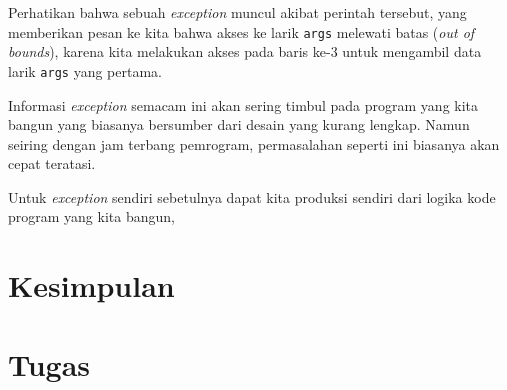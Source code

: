 Perhatikan bahwa sebuah \textit{exception} muncul akibat perintah tersebut, yang memberikan pesan ke kita bahwa akses ke larik \texttt{args} melewati batas (\textit{out of bounds}), karena kita melakukan akses pada baris ke-3 untuk mengambil data larik \texttt{args} yang pertama.

Informasi \textit{exception} semacam ini akan sering timbul pada program yang kita bangun yang biasanya bersumber dari desain yang kurang lengkap. Namun seiring dengan jam terbang pemrogram, permasalahan seperti ini biasanya akan cepat teratasi.

Untuk \textit{exception} sendiri sebetulnya dapat kita produksi sendiri dari logika kode program yang kita bangun, 

\section{Kesimpulan}

\section{Tugas}
